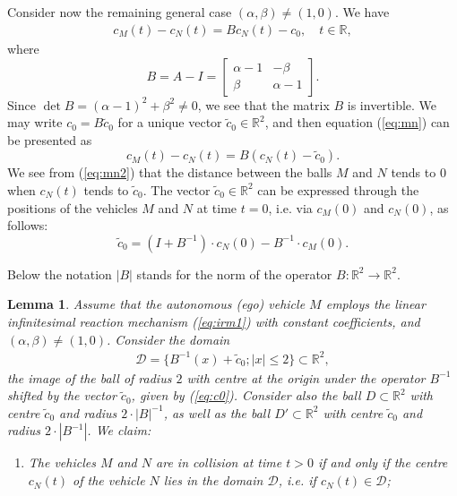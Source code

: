 \documentclass[11pt]{amsart}
\newtheorem{lemma}[theorem]{Lemma}
\def\R{\mathbb R}
\begin{document}
{\subsection{} Consider now the remaining general case $(\alpha, \beta)\not= (1, 0)$.  We have 
\begin{eqnarray}\label{eq:mn}
c_M(t)-c_N(t) = Bc_N(t) -c_0, \quad t\in \R,
\end{eqnarray}
where $$B=A-I= \left[ \begin{array}{cc} \alpha-1& -\beta\\ \beta&\alpha-1\end{array}\right].$$
Since $\det B = (\alpha-1)^2+\beta^2\not=0$, we see that the matrix $B$ is invertible. We may write $c_0=B\tilde c_0$ for a unique vector $\tilde c_0\in \R^2$, and then 
equation (\ref{eq:mn}) can be presented as 
\begin{equation}\label{eq:mn2}
c_M(t)-c_N(t) = B(c_N(t) -\tilde c_0).
\end{equation}
We see from (\ref{eq:mn2}) that the distance between the balls $M$ and $N$ tends to 0 when $c_N(t)$ tends to $\tilde c_0$. 
The vector $\tilde c_0\in \R^2$ can be expressed through the positions of the vehicles $M$ and $N$ at time $t=0$, i.e. via $c_M(0)$ and $c_N(0)$, as follows:
\begin{equation}\label{eq:c0}
\tilde c_0= (I+B^{-1})\cdot c_N(0) - B^{-1}\cdot c_M(0).
\end{equation}

Below the notation $|B|$ stands for the norm of the operator $B:\R^2\to \R^2$. 

\begin{lemma}\label{lm:61} Assume that the autonomous (ego) vehicle $M$ employs the linear infinitesimal reaction mechanism (\ref{eq:irm1}) with constant coefficients, and $(\alpha, \beta)\not= (1, 0)$. Consider the domain 
\begin{eqnarray}
\mathcal D=\{B^{-1}(x)+\tilde c_0; |x|\le 2\}\subset \R^2,
\end{eqnarray}
the image of the ball of radius $2$ with centre at the origin under the operator $B^{-1}$ shifted by the vector $\tilde c_0$, given by (\ref{eq:c0}).
Consider also the ball $D\subset \R^2$ with centre $\tilde c_0$ and radius $2\cdot |B|^{-1}$, as well as the ball $D'\subset \R^2$ with centre $\tilde c_0$ and radius 
$2\cdot |B^{-1}|$. 
We claim:
\begin{enumerate}
\item[{(a)}] The vehicles $M$ and $N$ are in collision at time $t>0$ if and only if the centre $c_N(t)$ of the vehicle $N$ lies in the 
domain $\mathcal D$, i.e. if $c_N(t)\in \mathcal D$;  


\end{enumerate}
\end{lemma}}
\end{document}
